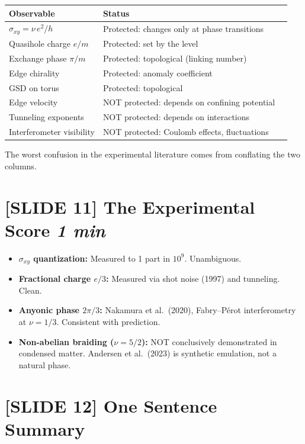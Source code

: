 \documentclass[11pt]{article}
\begin{document}
\begin{center}
\begin{tabular}{lll}
\toprule
Observable & Status \\
\midrule
$\sigma_{xy} = \nu\, e^2/h$ & Protected: changes only at phase transitions \\
Quasihole charge $e/m$ & Protected: set by the level \\
Exchange phase $\pi/m$ & Protected: topological (linking number) \\
Edge chirality & Protected: anomaly coefficient \\
GSD on torus & Protected: topological \\
\midrule
Edge velocity & NOT protected: depends on confining potential \\
Tunneling exponents & NOT protected: depends on interactions \\
Interferometer visibility & NOT protected: Coulomb effects, fluctuations \\
\bottomrule
\end{tabular}
\end{center}

The worst confusion in the experimental literature comes from conflating the two columns.

\section{[SLIDE 11] The Experimental Score \hfill \normalfont\textit{1 min}}

\begin{itemize}[nosep]
\item \textbf{$\sigma_{xy}$ quantization:} Measured to 1 part in $10^9$. Unambiguous.
\item \textbf{Fractional charge $e/3$:} Measured via shot noise (1997) and tunneling. Clean.
\item \textbf{Anyonic phase $2\pi/3$:} Nakamura et al.\ (2020), Fabry--P\'erot interferometry at $\nu = 1/3$. Consistent with prediction.
\item \textbf{Non-abelian braiding ($\nu = 5/2$):} NOT conclusively demonstrated in condensed matter. Andersen et al.\ (2023) is synthetic emulation, not a natural phase.
\end{itemize}

\section{[SLIDE 12] One Sentence Summary}
\end{document}
